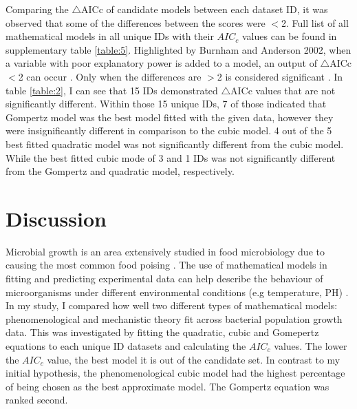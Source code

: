 \documentclass[11pt]{article}
\begin{document}
Comparing the $\triangle$AICc of candidate models between each dataset ID, it was observed that some of the differences between the scores were $<$2. 
Full list of all mathematical models in all unique IDs with their $AIC_{c}$ values can be found in supplementary table \ref{table:5}. Highlighted
by Burnham and Anderson 2002, when a variable with poor explanatory power is added to a model, an output of $\triangle$AICc$<$2 can 
occur \cite{burnham_basic_2002,arnold_uninformative_2010}. Only when the differences are $>$2 is considered significant \cite{wyss_seismicity_2012}. 
In table \ref{table:2}, I can see that 15 IDs demonstrated $\triangle$AICc values that are not significantly different. Within those 15
unique IDs, 7 of those indicated that Gompertz model was the best model fitted with the given data, however they were insignificantly different in comparison
to the cubic model. 4 out of the 5 best fitted quadratic model was not significantly different from the cubic model. While the best fitted cubic mode of 3 and
1 IDs was not significantly different from the Gompertz and quadratic model, respectively.

\section{Discussion}

Microbial growth is an area extensively studied in food microbiology due to causing the most common food poising \cite{buchanan_when_1997,xiong_comparison_1999}. The use of mathematical models
in fitting and predicting experimental data can help describe the behaviour of microorganisms under different environmental conditions (e.g temperature, PH) \cite{zwietering_modeling_1990}.
In my study, I compared how well two different types of mathematical models: phenomenological and mechanistic theory fit across bacterial population
growth data. This was investigated by fitting the quadratic, cubic and Gomepertz equations to each unique ID datasets and calculating the $AIC_{c}$ values. 
The lower the $AIC_{c}$ value, the best model it is out of the candidate set. In contrast to my initial hypothesis, the phenomenological cubic model 
had the highest percentage of being chosen as the best approximate model. The Gompertz equation was ranked second.  
\end{document}
